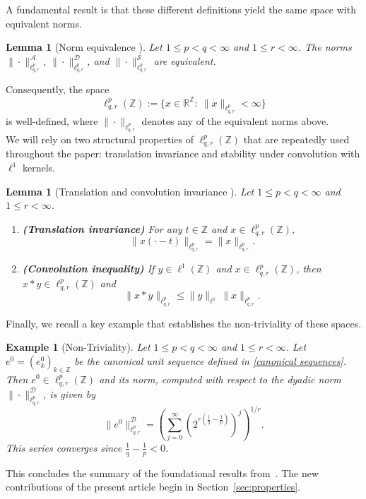 \documentclass[preprint,12pt]{elsarticle}
\newtheorem{lemma}[theorem]{Lemma}
\newtheorem{example}[theorem]{Example}
\begin{document}
A fundamental result is that these different definitions yield the same space with equivalent norms.
\begin{lemma}[Norm equivalence {\cite[Theorem~3.1]{GuzmanSanMartinVillegas}}]\label{lem:norm_equivalence}
Let $1\le p<q<\infty$ and $1\le r<\infty$. The norms
$\|\cdot\|^{\mathcal A}_{\ell^{p}_{q,r}}$, $\|\cdot\|^{\mathcal D}_{\ell^{p}_{q,r}}$, and
$\|\cdot\|^{\mathcal S}_{\ell^{p}_{q,r}}$ are equivalent.
\end{lemma}

Consequently, the space
\[
\ell^{p}_{q,r}(\mathbb{Z})
:=\Big\{x\in\mathbb{R}^{\mathbb{Z}}:\ \|x\|_{\ell^{p}_{q,r}}<\infty\Big\}
\]
is well-defined, where $\|\cdot\|_{\ell^{p}_{q,r}}$ denotes any of the equivalent norms above.\\
\noindent
We will rely on two structural properties of $\ell^{p}_{q,r}(\mathbb Z)$ that are repeatedly used throughout the paper:
translation invariance and stability under convolution with $\ell^1$ kernels.

\begin{lemma}[Translation and convolution invariance {\cite[Proposition~2.2]{GuzmanSanMartinVillegas}}]\label{lem:trans_conv}
Let $1 \le p < q < \infty$ and $1 \le r < \infty$.
\begin{enumerate}
\item[(i)] \textbf{(Translation invariance)} For any $t \in \mathbb Z$ and $x \in \ell^{p}_{q,r}(\mathbb Z)$,
\[
\|x(\cdot-t)\|_{\ell^{p}_{q,r}}=\|x\|_{\ell^{p}_{q,r}}.
\]
\item[(ii)] \textbf{(Convolution inequality)} If $y\in \ell^{1}(\mathbb Z)$ and $x\in \ell^{p}_{q,r}(\mathbb Z)$, then
$x*y\in \ell^{p}_{q,r}(\mathbb Z)$ and
\[
\|x*y\|_{\ell^{p}_{q,r}} \le \|y\|_{\ell^{1}}\,\|x\|_{\ell^{p}_{q,r}}.
\]
\end{enumerate}
\end{lemma}

Finally, we recall a key example that establishes the non-triviality of these spaces. 

\begin{example}[Non-Triviality]\label{ex:non_trivial}
Let $1 \leq p < q < \infty$ and $1 \leq r < \infty$. Let $e^{0} = (e^{0}_{k})_{k \in \mathbb{Z}}$ be the canonical unit sequence defined in \ref{canonical sequences}. Then $e^{0} \in \ell^{p}_{q,r}(\mathbb{Z})$ and its norm, computed with respect to the dyadic norm $\| \cdot \|^{\mathcal{D}}_{\ell^{p}_{q,r}}$, is given by
\[
    \| e^{0} \|^{\mathcal{D}}_{\ell^{p}_{q,r}} = \left( \sum_{j=0}^{\infty} \left( 2^{r \left(\frac{1}{q} - \frac{1}{p}\right)} \right)^{j} \right)^{1/r}.
\]
This series converges since $\frac{1}{q} - \frac{1}{p} < 0$.
\end{example}
This concludes the summary of the foundational results from~\cite{GuzmanSanMartinVillegas}. The new contributions of the present article begin in Section~\ref{sec:properties}.
\end{document}
